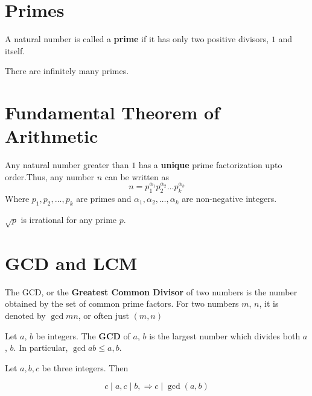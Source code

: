 \section{Primes}

\begin{definition}
    A natural number is called a \textbf{prime} if it has only two positive divisors, $1$ and itself.
\end{definition}

\begin{theorem}[Euclid]
    There are infinitely many primes.
\end{theorem}

\section{Fundamental Theorem of Arithmetic}

\begin{theorem}
    Any natural number greater than $1$ has a \textbf{unique} prime factorization upto order.Thus, any number $n$ can be written as 
    \[n=p_1^{\alpha_1}p_2^{\alpha_2}\dots p_k^{\alpha_k}\]
    Where $p_1, p_2, \dots, p_k$ are primes and $\alpha_1, \alpha_2,\dots, \alpha_k$ are non-negative integers. 
\end{theorem}

\begin{lemma}
    $\sqrt{p}$ is irrational for any prime $p$.
\end{lemma}

\section{GCD and LCM}

\begin{definition}
    The GCD, or the \textbf{Greatest Common Divisor} of two numbers is the
number obtained by the set of common prime factors. For two numbers $m$, $n$, it is denoted
by $\gcd{m}{n}$, or often just $(m, n)$
\end{definition}

\begin{lemma}
    Let $a$, $b$ be integers. The \textbf{GCD} of $a$, $b$ is the largest number which divides both $a$, $b$. In particular, $\gcd{a}{b} \leq a, b$.
\end{lemma}

\begin{lemma}

Let $a,b,c$ be three integers. Then

\[c\mid a, c\mid b,\Rightarrow  c \mid \gcd(a,b)\]

\end{lemma}

